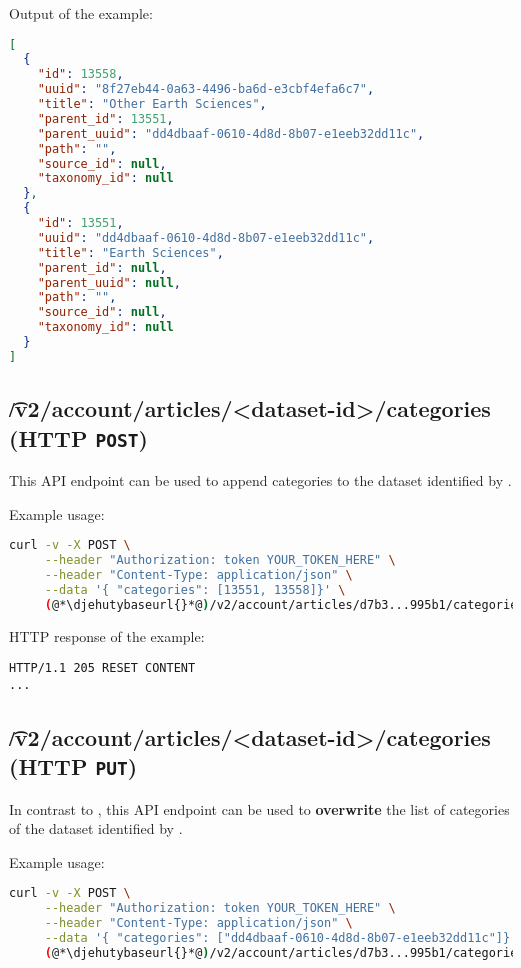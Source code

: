   Output of the example:
\begin{lstlisting}[language=JSON]
[
  {
    "id": 13558,
    "uuid": "8f27eb44-0a63-4496-ba6d-e3cbf4efa6c7",
    "title": "Other Earth Sciences",
    "parent_id": 13551,
    "parent_uuid": "dd4dbaaf-0610-4d8d-8b07-e1eeb32dd11c",
    "path": "",
    "source_id": null,
    "taxonomy_id": null
  },
  {
    "id": 13551,
    "uuid": "dd4dbaaf-0610-4d8d-8b07-e1eeb32dd11c",
    "title": "Earth Sciences",
    "parent_id": null,
    "parent_uuid": null,
    "path": "",
    "source_id": null,
    "taxonomy_id": null
  }
]
\end{lstlisting}

\subsection{\t{/v2/account/articles/<dataset-id>/categories} (HTTP \texttt{POST})}
\label{sec:api-v2-articles-categories-post}

  This API endpoint can be used to append categories to the dataset identified
  by .

  Example usage:
\begin{lstlisting}[language=bash]
curl -v -X POST \
     --header "Authorization: token YOUR_TOKEN_HERE" \
     --header "Content-Type: application/json" \
     --data '{ "categories": [13551, 13558]}' \
     (@*\djehutybaseurl{}*@)/v2/account/articles/d7b3...995b1/categories
\end{lstlisting}

  HTTP response of the example:
\begin{lstlisting}
HTTP/1.1 205 RESET CONTENT
...
\end{lstlisting}

\subsection{\t{/v2/account/articles/<dataset-id>/categories} (HTTP \texttt{PUT})}

  In contrast to , this API endpoint
  can be used to \textbf{overwrite} the list of categories of the dataset identified
  by \code{dataset-id}.

  Example usage:
\begin{lstlisting}[language=bash]
curl -v -X POST \
     --header "Authorization: token YOUR_TOKEN_HERE" \
     --header "Content-Type: application/json" \
     --data '{ "categories": ["dd4dbaaf-0610-4d8d-8b07-e1eeb32dd11c"]}' \
     (@*\djehutybaseurl{}*@)/v2/account/articles/d7b3...995b1/categories
\end{lstlisting}

